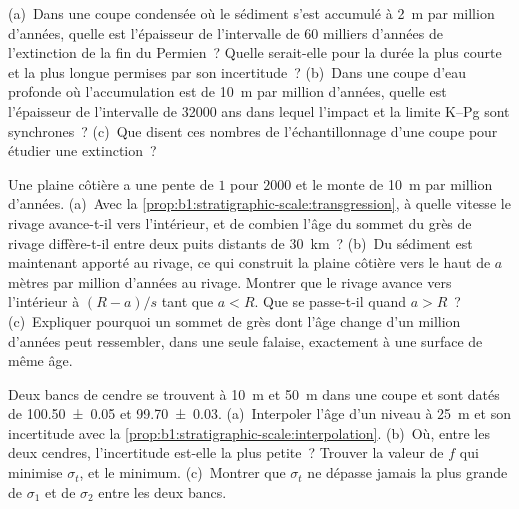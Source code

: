 \begin{exercise}[$\star\star$]\label{exo:b1:stratigraphic-scale:9}
(a)~Dans une coupe condensée où le sédiment s'est accumulé à \qty{2}{m} par million
d'années, quelle est l'épaisseur de l'intervalle de \num{60} milliers d'années de l'extinction de la
fin du Permien~? Quelle serait-elle pour la durée la plus courte et la plus longue
permises par son incertitude~? (b)~Dans une coupe d'eau profonde où l'accumulation est de
\qty{10}{m} par million d'années, quelle est l'épaisseur de l'intervalle de \num{32000} ans
dans lequel l'impact et la limite K--Pg sont synchrones~? (c)~Que disent
ces nombres de l'échantillonnage d'une coupe pour étudier une extinction~?
\end{exercise}

\begin{exercise}[$\star\star\star$]\label{exo:b1:stratigraphic-scale:10}
Une plaine côtière a une pente de $1$ pour $2000$ et le  monte de
\qty{10}{m} par million d'années. (a)~Avec la
\cref{prop:b1:stratigraphic-scale:transgression}, à quelle vitesse le rivage
avance-t-il vers l'intérieur, et de combien l'âge du sommet du grès de rivage
diffère-t-il entre deux puits distants de \qty{30}{km}~? (b)~Du sédiment est maintenant apporté au
rivage, ce qui construit la plaine côtière vers le haut de $a$ mètres par million d'années au
rivage. Montrer que le rivage avance vers l'intérieur à $(R - a)/s$ tant que
$a < R$. Que se passe-t-il quand $a > R$~? (c)~Expliquer pourquoi un sommet de grès dont l'âge
change d'un million d'années peut ressembler, dans une seule falaise, exactement à une surface de
même âge.
\end{exercise}

\begin{exercise}[$\star\star\star$]\label{exo:b1:stratigraphic-scale:11}
Deux bancs de cendre se trouvent à \qty{10}{m} et \qty{50}{m} dans une coupe et sont datés de
\qty[uncertainty-mode=separate]{100.50(5)}{\Ma} et \qty[uncertainty-mode=separate]{99.70(3)}{\Ma}. (a)~Interpoler l'âge d'un niveau
à \qty{25}{m} et son incertitude avec la
\cref{prop:b1:stratigraphic-scale:interpolation}. (b)~Où, entre les deux cendres,
l'incertitude est-elle la plus petite~? Trouver la valeur de $f$ qui minimise $\sigma_t$, et
le minimum. (c)~Montrer que $\sigma_t$ ne dépasse jamais la plus grande de $\sigma_1$ et de
$\sigma_2$ entre les deux bancs.
\end{exercise}

